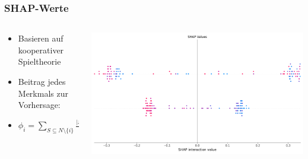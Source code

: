 \documentclass[aspectratio=1610, xcolor=dvipsnames, 9pt]{beamer}
\begin{document}
\begin{frame}
  \frametitle{SHAP-Werte}
  \begin{columns}
    \begin{column}{0.6\textwidth}
      \begin{itemize}
        \item Basieren auf kooperativer Spieltheorie
        \item Beitrag jedes Merkmals zur Vorhersage:
        \item $\phi_i = \sum_{S \subseteq N \setminus \{i\}} \frac{|S|! (|N| - |S| - 1)!}{|N|!} \left[ f(S \cup \{i\}) - f(S) \right]$
      \end{itemize}
    \end{column}
    \begin{column}{0.4\textwidth}
      \includegraphics[width=\textwidth]{images/shap_values.png}
    \end{column}
  \end{columns}
\end{frame}
\end{document}
